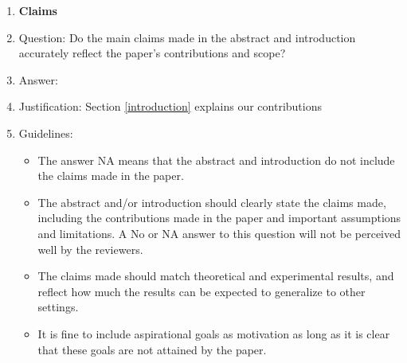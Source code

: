 \documentclass{article}
\begin{document}
\begin{enumerate}

\item {\bf Claims}
    \item[] Question: Do the main claims made in the abstract and introduction accurately reflect the paper's contributions and scope?
    \item[] Answer: \answerYes{} %
    \item[] Justification: Section \ref{introduction} explains our contributions
    \item[] Guidelines:
    \begin{itemize}
        \item The answer NA means that the abstract and introduction do not include the claims made in the paper.
        \item The abstract and/or introduction should clearly state the claims made, including the contributions made in the paper and important assumptions and limitations. A No or NA answer to this question will not be perceived well by the reviewers. 
        \item The claims made should match theoretical and experimental results, and reflect how much the results can be expected to generalize to other settings. 
        \item It is fine to include aspirational goals as motivation as long as it is clear that these goals are not attained by the paper. 
    \end{itemize}


\end{enumerate}
\end{document}
